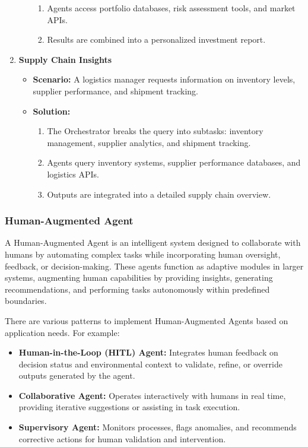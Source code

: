 \documentclass[12pt]{article}
\begin{document}
\begin{enumerate}
\begin{itemize}
\begin{enumerate}
            \item Agents access portfolio databases, risk assessment tools, and market APIs.
            \item Results are combined into a personalized investment report.
        \end{enumerate}
    \end{itemize}
\newpage
    \item \textbf{Supply Chain Insights}
    \begin{itemize}
        \item \textbf{Scenario:} A logistics manager requests information on inventory levels, supplier performance, and shipment tracking.
        \item \textbf{Solution:}
        \begin{enumerate}
            \item The Orchestrator breaks the query into subtasks: inventory management, supplier analytics, and shipment tracking.
            \item Agents query inventory systems, supplier performance databases, and logistics APIs.
            \item Outputs are integrated into a detailed supply chain overview.
        \end{enumerate}
    \end{itemize}
\end{enumerate}

\subsubsection{Human-Augmented Agent}
A Human-Augmented Agent is an intelligent system designed to collaborate with humans by automating complex tasks while incorporating human oversight, feedback, or decision-making. These agents function as adaptive modules in larger systems, augmenting human capabilities by providing insights, generating recommendations, and performing tasks autonomously within predefined boundaries.

There are various patterns to implement Human-Augmented Agents based on application needs. For example:
\begin{itemize}
    \item \textbf{Human-in-the-Loop (HITL) Agent:} Integrates human feedback on decision status and environmental context to validate, refine, or override outputs generated by the agent.
    \item \textbf{Collaborative Agent:} Operates interactively with humans in real time, providing iterative suggestions or assisting in task execution.
    \item \textbf{Supervisory Agent:} Monitors processes, flags anomalies, and recommends corrective actions for human validation and intervention.
\end{itemize}
\end{document}
